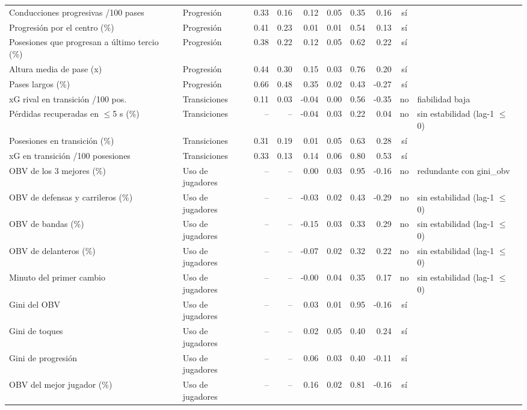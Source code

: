 {\begin{longtable}{p{4.2cm} p{2.3cm} rrrrrrc p{2.9cm}}
Conducciones progresivas /100 pases & Progresión & 0.33 & 0.16 & 0.12 & 0.05 & 0.35 & 0.16 & sí &  \\
Progresión por el centro (\%) & Progresión & 0.41 & 0.23 & 0.01 & 0.01 & 0.54 & 0.13 & sí &  \\
Posesiones que progresan a último tercio (\%) & Progresión & 0.38 & 0.22 & 0.12 & 0.05 & 0.62 & 0.22 & sí &  \\
Altura media de pase (x) & Progresión & 0.44 & 0.30 & 0.15 & 0.03 & 0.76 & 0.20 & sí &  \\
Pases largos (\%) & Progresión & 0.66 & 0.48 & 0.35 & 0.02 & 0.43 & -0.27 & sí &  \\
xG rival en transición /100 pos. & Transiciones & 0.11 & 0.03 & -0.04 & 0.00 & 0.56 & -0.35 & no & fiabilidad baja \\
Pérdidas recuperadas en $\leq$5 s (\%) & Transiciones & -- & -- & -0.04 & 0.03 & 0.22 & 0.04 & no & sin estabilidad (lag-1 $\leq$ 0) \\
Posesiones en transición (\%) & Transiciones & 0.31 & 0.19 & 0.01 & 0.05 & 0.63 & 0.28 & sí &  \\
xG en transición /100 posesiones & Transiciones & 0.33 & 0.13 & 0.14 & 0.06 & 0.80 & 0.53 & sí &  \\
OBV de los 3 mejores (\%) & Uso de jugadores & -- & -- & 0.00 & 0.03 & 0.95 & -0.16 & no & redundante con gini\_obv \\
OBV de defensas y carrileros (\%) & Uso de jugadores & -- & -- & -0.03 & 0.02 & 0.43 & -0.29 & no & sin estabilidad (lag-1 $\leq$ 0) \\
OBV de bandas (\%) & Uso de jugadores & -- & -- & -0.15 & 0.03 & 0.33 & 0.29 & no & sin estabilidad (lag-1 $\leq$ 0) \\
OBV de delanteros (\%) & Uso de jugadores & -- & -- & -0.07 & 0.02 & 0.32 & 0.22 & no & sin estabilidad (lag-1 $\leq$ 0) \\
Minuto del primer cambio & Uso de jugadores & -- & -- & -0.00 & 0.04 & 0.35 & 0.17 & no & sin estabilidad (lag-1 $\leq$ 0) \\
Gini del OBV & Uso de jugadores & -- & -- & 0.03 & 0.01 & 0.95 & -0.16 & sí &  \\
Gini de toques & Uso de jugadores & -- & -- & 0.02 & 0.05 & 0.40 & 0.24 & sí &  \\
Gini de progresión & Uso de jugadores & -- & -- & 0.06 & 0.03 & 0.40 & -0.11 & sí &  \\
OBV del mejor jugador (\%) & Uso de jugadores & -- & -- & 0.16 & 0.02 & 0.81 & -0.16 & sí &  \\

\end{longtable}}
